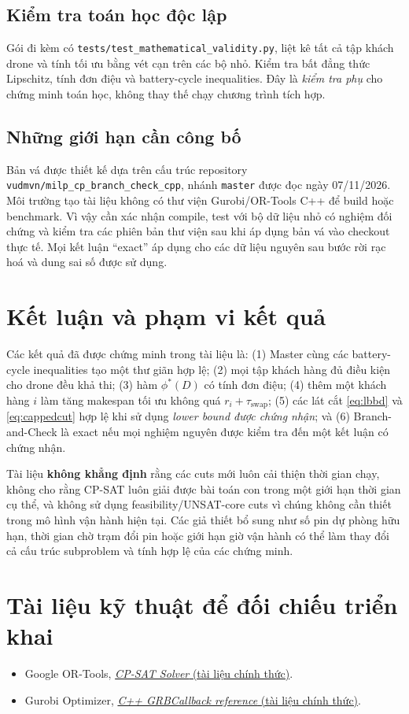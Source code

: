 \documentclass[11pt,a4paper]{article}
\theoremstyle{definition}
\theoremstyle{plain}
\theoremstyle{remark}
\newcommand{\sw}{\tau_{\mathrm{swap}}}
\newcommand{\opt}{\phi^*}
\begin{document}
\subsection{Kiểm tra toán học độc lập}
Gói đi kèm có \texttt{tests/test\_mathematical\_validity.py}, liệt kê tất cả tập khách drone và tính tối ưu bằng vét cạn trên các bộ nhỏ. Kiểm tra bất đẳng thức Lipschitz, tính đơn điệu và battery-cycle inequalities. Đây là \emph{kiểm tra phụ} cho chứng minh toán học, không thay thế chạy chương trình tích hợp.

\subsection{Những giới hạn cần công bố}
Bản vá được thiết kế dựa trên cấu trúc repository \texttt{vudmvn/milp\_cp\_branch\_check\_cpp}, nhánh \texttt{master} được đọc ngày 07/11/2026. Môi trường tạo tài liệu không có thư viện Gurobi/OR-Tools C++ để build hoặc benchmark. Vì vậy cần xác nhận compile, test với bộ dữ liệu nhỏ có nghiệm đối chứng và kiểm tra các phiên bản thư viện sau khi áp dụng bản vá vào checkout thực tế. Mọi kết luận ``exact'' áp dụng cho các dữ liệu nguyên sau bước rời rạc hoá và dung sai số được sử dụng.

\section{Kết luận và phạm vi kết quả}
Các kết quả đã được chứng minh trong tài liệu là: (1) Master cùng các battery-cycle inequalities tạo một thư giãn hợp lệ; (2) mọi tập khách hàng đủ điều kiện cho drone đều khả thi; (3) hàm $\opt(D)$ có tính đơn điệu; (4) thêm một khách hàng $i$ làm tăng makespan tối ưu không quá $r_i+\sw$; (5) các lát cắt \eqref{eq:lbbd} và \eqref{eq:cappedcut} hợp lệ khi sử dụng \emph{lower bound được chứng nhận}; và (6) Branch-and-Check là exact nếu mọi nghiệm nguyên được kiểm tra đến một kết luận có chứng nhận.

Tài liệu \textbf{không khẳng định} rằng các cuts mới luôn cải thiện thời gian chạy, không cho rằng CP-SAT luôn giải được bài toán con trong một giới hạn thời gian cụ thể, và không sử dụng feasibility/UNSAT-core cuts vì chúng không cần thiết trong mô hình vận hành hiện tại. Các giả thiết bổ sung như số pin dự phòng hữu hạn, thời gian chờ trạm đổi pin hoặc giới hạn giờ vận hành có thể làm thay đổi cả cấu trúc subproblem và tính hợp lệ của các chứng minh.

\section*{Tài liệu kỹ thuật để đối chiếu triển khai}
\begin{itemize}
\item Google OR-Tools, \href{https://developers.google.com/optimization/cp/cp_solver}{\emph{CP-SAT Solver} (tài liệu chính thức)}.
\item Gurobi Optimizer, \href{https://docs.gurobi.com/projects/optimizer/en/current/reference/cpp/callback.html}{\emph{C++ GRBCallback reference} (tài liệu chính thức)}.
\end{itemize}
\end{document}
